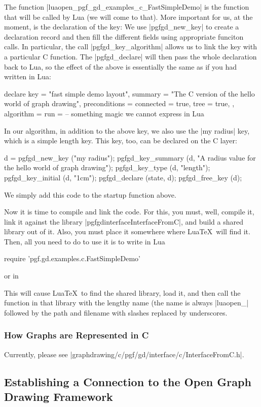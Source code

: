 The function |luaopen_pgf_gd_examples_c_FastSimpleDemo| is the
function that will be called by Lua (we will come to that). More
important for us, at the moment, is the declaration of the key: We use
|pgfgd_new_key| to create a declaration record and then fill the
different fields using appropriate funciton calls. In particular, the
call |pgfgd_key_algorithm| allows us to link the key with a particular
C function. The |pgfgd_declare| will then pass the whole declaration
back to Lua, so the effect of the above is essentially the same as if
you had written in Lua:
\begin{codeexample}
declare {
  key = "fast simple demo layout",
  summary = "The C version of the hello world of graph drawing",
  preconditions = {
    connected = true,
    tree = true,
  },
  algorithm = {
    run =  -- something magic we cannot express in Lua
  }
}
\end{codeexample}

In our algorithm, in addition to the above key, we also use the
|my radius| key, which is a simple length key. This key, too, can be
declared on the C layer:

\begin{codeexample}
  d = pgfgd_new_key ("my radius");
  pgfgd_key_summary (d, "A radius value for the hello world of graph drawing");
  pgfgd_key_type    (d, "length");
  pgfgd_key_initial (d, "1cm");
  pgfgd_declare     (state, d);
  pgfgd_free_key    (d);
\end{codeexample}

We simply add this code to the startup function above.

Now it is time to compile and link the code. For this, you must, well,
compile it, link it against the library
|pgfgdinterfaceInterfaceFromC|, and build a shared library out of
it. Also, you must place it somewhere where Lua\TeX\ will find
it. Then, all you need to do to use it is to write in Lua 

\begin{codeexample}
require 'pgf.gd.examples.c.FastSimpleDemo'  
\end{codeexample}
or in \tikzname
\begin{codeexample}
\end{codeexample}

This will cause Lua\TeX\ to find the shared library, load it, and then
call the function in that library with the lengthy name (the name is
always |luaopen_| followed by the path and filename with slashes
replaced by underscores. 


\subsubsection{How Graphs are Represented in C}

Currently, please see |graphdrawing/c/pgf/gd/interface/c/InterfaceFromC.h|.





\subsection{Establishing a Connection to the Open Graph Drawing Framework}

